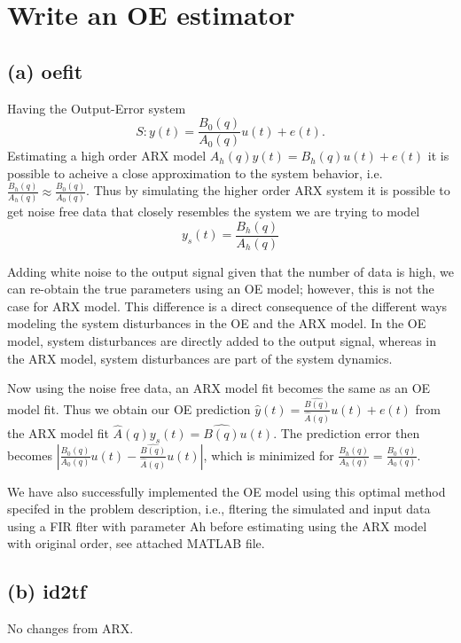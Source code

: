\documentclass[]{article}
\begin{document}
\section{Write an OE estimator}

\subsection{(a) oefit}
Having the Output-Error system
\begin{equation}
	S: y(t) = \frac{B_0(q)}{A_0(q)}u(t) + e(t).
\end{equation}
Estimating a high order ARX model $A_h(q)y(t) = B_h(q)u(t) + e(t)$ it is possible to acheive a close approximation to the system behavior, i.e. $\frac{B_h(q)}{A_h(q)} \approx \frac{B_0(q)}{A_0(q)}$. Thus by simulating the higher order ARX system it is possible to get noise free data that closely resembles the system we are trying to model
\begin{equation}
	y_s(t) = \frac{B_h(q)}{A_h(q)}
\end{equation}

Adding white noise to the output signal given that the number of data is high, we can re-obtain the true parameters using an OE model; however, this is not the case for ARX model. This difference is a direct consequence of the different ways modeling the system disturbances in the OE and the ARX model. In the OE model, system disturbances are directly added to the output signal, whereas in the ARX model, system disturbances are part of the system dynamics.

Now using the noise free data, an ARX model fit becomes the same as an OE model fit. Thus we obtain our OE prediction $\hat{y}(t) = \frac{\hat{B(q)}}{\hat{A}(q)}u(t) + e(t)$ from the ARX model fit $\hat{A}(q)y_s(t) = \hat{B(q)}u(t)$. The prediction error then becomes $| \frac{B_0(q)}{A_0(q)}u(t) - \frac{\hat{B(q)}}{\hat{A}(q)}u(t)|$, which is minimized for $\frac{B_h(q)}{A_h(q)} = \frac{B_0(q)}{A_0(q)}$.

We have also successfully implemented the OE model using this optimal method specifed in the problem description, i.e., fltering the simulated and input data using a FIR flter with parameter Ah before estimating using the ARX model with original order, see attached MATLAB file.

\subsection{(b) id2tf}
No changes from ARX.
\end{document}
